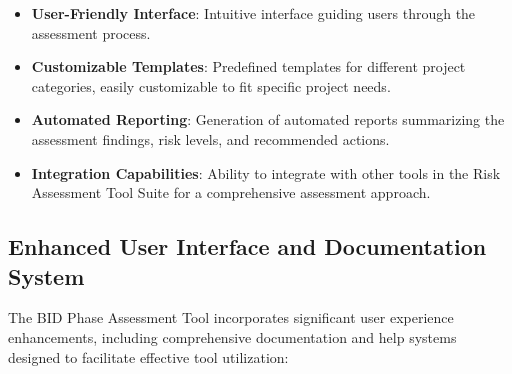 \documentclass[binding=0.6cm]{sapthesis}
\begin{document}
\begin{itemize}
    \item \textbf{User-Friendly Interface}: Intuitive interface guiding users through the assessment process.
    \item \textbf{Customizable Templates}: Predefined templates for different project categories, easily customizable to fit specific project needs.
    \item \textbf{Automated Reporting}: Generation of automated reports summarizing the assessment findings, risk levels, and recommended actions.
    \item \textbf{Integration Capabilities}: Ability to integrate with other tools in the Risk Assessment Tool Suite for a comprehensive assessment approach.
\end{itemize}

\subsection{Enhanced User Interface and Documentation System}

The BID Phase Assessment Tool incorporates significant user experience enhancements, including comprehensive documentation and help systems designed to facilitate effective tool utilization:
\end{document}
